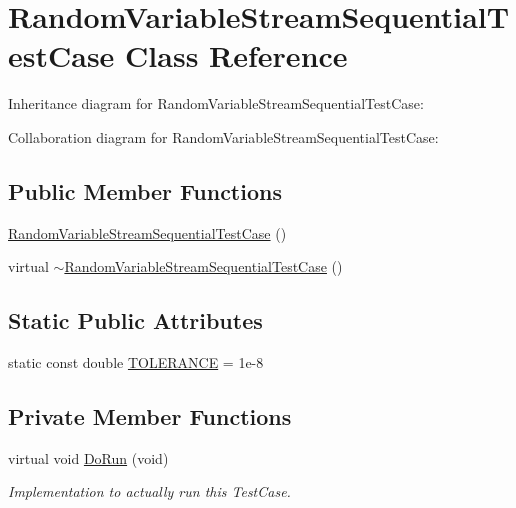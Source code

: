 \hypertarget{classRandomVariableStreamSequentialTestCase}{}\section{Random\+Variable\+Stream\+Sequential\+Test\+Case Class Reference}
\label{classRandomVariableStreamSequentialTestCase}


Inheritance diagram for Random\+Variable\+Stream\+Sequential\+Test\+Case\+:


Collaboration diagram for Random\+Variable\+Stream\+Sequential\+Test\+Case\+:
\subsection*{Public Member Functions}
\begin{DoxyCompactItemize}
\item 
\hyperlink{classRandomVariableStreamSequentialTestCase_ac0dc2b8b217b91a0d87ff942172387e3}{Random\+Variable\+Stream\+Sequential\+Test\+Case} ()
\item 
virtual \hyperlink{classRandomVariableStreamSequentialTestCase_a116c3d47c1fcd7b9dcf38dc5b7bafe72}{$\sim$\+Random\+Variable\+Stream\+Sequential\+Test\+Case} ()
\end{DoxyCompactItemize}
\subsection*{Static Public Attributes}
\begin{DoxyCompactItemize}
\item 
static const double \hyperlink{classRandomVariableStreamSequentialTestCase_ad778eacda1b5bd5d31f802ad496db392}{T\+O\+L\+E\+R\+A\+N\+CE} = 1e-\/8
\end{DoxyCompactItemize}
\subsection*{Private Member Functions}
\begin{DoxyCompactItemize}
\item 
virtual void \hyperlink{classRandomVariableStreamSequentialTestCase_af20ba034dc64583488703717f1f964df}{Do\+Run} (void)
\begin{DoxyCompactList}\small\item\em Implementation to actually run this Test\+Case. \end{DoxyCompactList}\end{DoxyCompactItemize}
